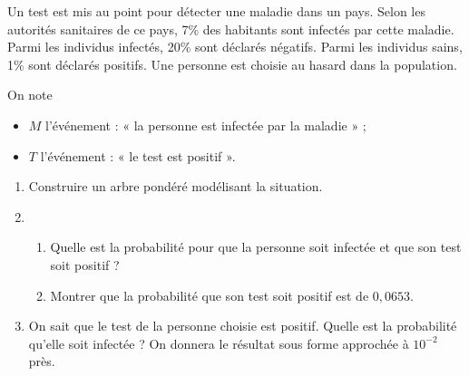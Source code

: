 \documentclass[11pt,fleqn, openany]{book} %
\begin{document}
\begin{exercise}[subtitle={(Polynésie 2021)}]

Un test est mis au point pour détecter une maladie dans un pays.
Selon les autorités sanitaires de ce pays, 7\% des habitants sont infectés par cette maladie. Parmi les individus infectés, 20\% sont déclarés négatifs.
Parmi les individus sains, 1\% sont déclarés positifs.
Une personne est choisie au hasard dans la population.

On note
\begin{itemize}
\item $M$ l'événement : « la personne est infectée par la maladie » ;
\item $T$ l'événement : « le test est positif ».
\end{itemize}

\begin{enumerate}
\item Construire un arbre pondéré modélisant la situation.
\item \begin{enumerate}
\item Quelle est la probabilité pour que la personne soit infectée et que son test soit positif ?
\item Montrer que la probabilité que son test soit positif est de $0,0653$.
\end{enumerate}
\item On sait que le test de la personne choisie est positif. Quelle est la probabilité qu'elle soit infectée ?
On donnera le résultat sous forme approchée à $10^{-2}$ près.
\end{enumerate}

\end{exercise}
\end{document}
